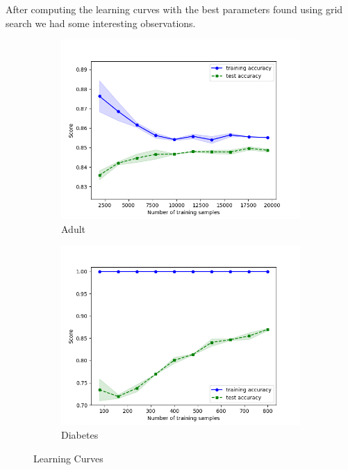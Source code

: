 \documentclass[11pt, twocolumn]{article}
\begin{document}
    After computing the learning curves with the best parameters found using grid search we had some interesting observations.

    \begin{figure}[!htbp]
        \begin{subfigure}{.24\textwidth}
            \centering
            \includegraphics[width=.9\textwidth]{learnings_Adult_MLP_optimized}
            \caption{Adult}
            \label{fig:learnings_Adult_MLP_optimized}
        \end{subfigure}
        \begin{subfigure}{.24\textwidth}
            \centering
            \includegraphics[width=.9\textwidth]{learnings_Diabetes_MLP_optimized}
            \caption{Diabetes}
            \label{fig:learnings_Diabetes_MLP_optimized}
        \end{subfigure}
        \caption{Learning Curves}
    \end{figure}
    \FloatBarrier
\end{document}
